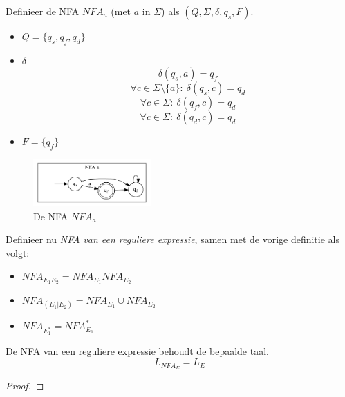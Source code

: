 \documentclass[main.tex]{subfiles}
\begin{document}
\begin{de}
  Definieer de NFA $NFA_{a}$ (met $a$ in $\Sigma$) als $(Q, \Sigma, \delta, q_{s}, F)$.

  \begin{itemize}
  \item $Q = \{q_{s},q_{f},q_{d}\}$
  \item $\delta$
    \[ \delta(q_{s}, a) = q_{f} \]
    \[ \forall c \in \Sigma\setminus\{a\}:\ \delta(q_{s}, c) = q_{d} \]
    \[ \forall c \in \Sigma:\ \delta(q_{f}, c) = q_{d}\]
    \[ \forall c \in \Sigma:\ \delta(q_{d}, c) = q_{d}\]
  \item $F = \{q_{f}\}$
  \end{itemize}

  \begin{figure}[H]
    \centering
    \includegraphics[width=0.4\textwidth]{assets/nfa_a.png}      
    \caption{De NFA $NFA_{a}$}
    \label{fig:nfa_a}
  \end{figure}
\end{de}

\begin{de}
  Definieer nu \emph{NFA van een reguliere expressie}, samen met de vorige definitie als volgt:
  \begin{itemize}
  \item $NFA_{E_{1}E_{2}} = NFA_{E_{1}}NFA_{E_{2}}$
  \item $NFA_{(E_{1}|E_{2})} = NFA_{E_{1}} \cup NFA_{E_{2}}$
  \item $NFA_{E_{1}^{*}} = NFA_{E_{1}}^{*}$
  \end{itemize}
\end{de}

\begin{st}
  De NFA van een reguliere expressie behoudt de bepaalde taal.
  \[ L_{NFA_{E}} = L_{E} \]

  \begin{proof}
  \end{proof}
\end{st}
\end{document}
